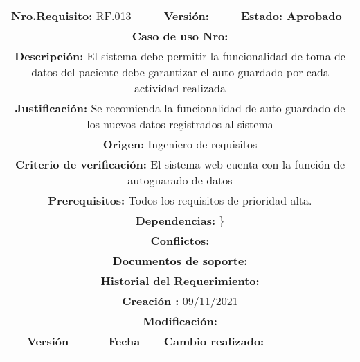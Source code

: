 \begin{center}
\begin{tabular}{|c|c|p{4cm}|p{4cm}|}
            \hline
            \rowcolor{red} \multicolumn{4}{|c|}{\textbf{Prioridad:} Alta}  \\
            \hline
            \multicolumn{2}{|l}{\textbf{Nro.Requisito: }RF.013} & \multicolumn{1}{|l}{\textbf{Versión: }} & \multicolumn{1}{|l|}{\textbf{Estado: Aprobado}} \\
            \multicolumn{4}{|p{13cm}|}{\textbf{Caso de uso Nro: }}  \\
            \hline
            \multicolumn{4}{|p{13cm}|}{\textbf{Descripción: } El sistema debe permitir la funcionalidad de toma de datos del paciente debe garantizar el auto-guardado por cada actividad realizada } \\
            \multicolumn{4}{|p{13cm}|}{\textbf{Justificación: } Se recomienda la funcionalidad de auto-guardado de los nuevos datos registrados al sistema} \\ 
            \multicolumn{4}{|p{13cm}|}{\textbf{Origen: }Ingeniero de requisitos}  \\
            \multicolumn{4}{|p{13cm}|}{\textbf{Criterio de verificación: } El sistema web cuenta con la función de autoguarado de datos} \\
            \hline
            \multicolumn{4}{|p{13cm}|}{\textbf{Prerequisitos: } Todos los requisitos de prioridad alta. }\\
            \hline \multicolumn{4}{|p{12cm}|}{\textbf{Dependencias: }
               \}
              }  \\
            \multicolumn{4}{|p{12cm}|}{\textbf{Conflictos: }}  \\
            \hline
            \multicolumn{4}{|p{12cm}|}{\textbf{Documentos de soporte: }}  \\
            \hline
            \multicolumn{4}{|p{12cm}|}{\textbf{Historial del Requerimiento: }}  \\
            \multicolumn{4}{|p{12cm}|}{\textbf{Creación : }09/11/2021}  \\
            \multicolumn{4}{|p{12cm}|}{\textbf{Modificación: }}  \\
             \textbf{Versión} & \textbf{Fecha} & \multicolumn{2}{p{8cm}|}{\textbf{Cambio realizado:}} \\
            \hline
                 & &   \multicolumn{2}{p{8cm}|}{}
              \\
            \hline
\end{tabular}







\end{center}
